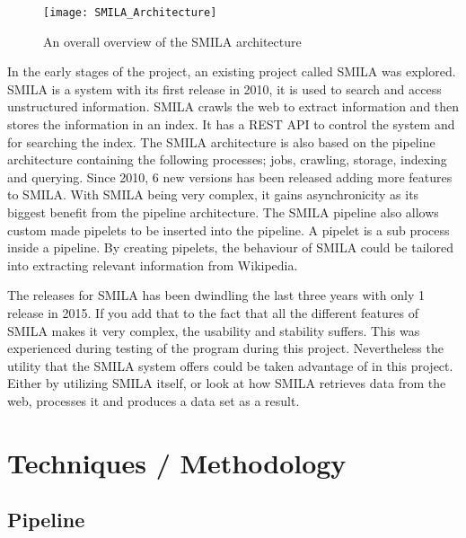 \begin{figure}[h]
\caption{An overall overview of the SMILA architecture}
\texttt{[image: SMILA\_Architecture]}
\end{figure}



In the early stages of the project, an existing project called SMILA \cite{smila} was explored. SMILA is a system with its first release in 2010, it is used to search and access unstructured information. SMILA crawls the web to extract information and then stores the information in an index. It has a REST API to control the system and for searching the index. The SMILA architecture is also based on the pipeline architecture containing the following processes; jobs, crawling, storage, indexing and querying. Since 2010, 6 new versions has been released adding more features to SMILA. With SMILA being very complex, it gains asynchronicity as its biggest benefit from the pipeline architecture. The SMILA pipeline also allows custom made pipelets to be inserted into the pipeline. A pipelet is a sub process inside a pipeline. By creating pipelets, the behaviour of SMILA could be tailored into extracting relevant information from Wikipedia.

The releases for SMILA has been dwindling the last three years with only 1 release in 2015. If you add that to the fact that all the different features of SMILA makes it very complex, the usability and stability suffers. This was experienced during testing of the program during this project.
Nevertheless the utility that the SMILA system offers could be taken advantage of in this project. Either by utilizing SMILA itself, or look at how SMILA retrieves data from the web, processes it and produces a data set as a result.


\section{Techniques / Methodology}

\subsection{Pipeline} \label{pipeline}

